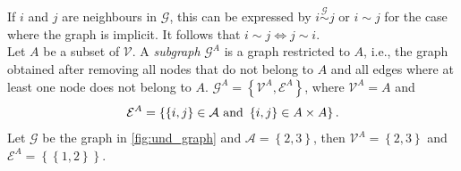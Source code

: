 If $i$ and $j$ are neighbours in $\mathcal{G}$, this can be expressed by $i\overset{\mathcal{G}}{\sim}j$ or $i\sim j$ for the case where the graph is implicit. It follows that $i\sim j\Longleftrightarrow j\sim i$. \\
Let $A$ be a subset of $\mathcal{V}$. A \textit{subgraph} $\mathcal{G}^A$ is a graph restricted to $A$, i.e., the graph obtained after removing all nodes that do not belong to $A$ and all edges where at least one node does not belong to $A$. $\mathcal{G}^A=\left\lbrace\mathcal{V}^A,\mathcal{E}^A\right\rbrace$, where $\mathcal{V}^A=A$ and 
\begin{equation*}
    \mathcal{E}^A = \left\lbrace\left\lbrace i,j\right\rbrace\in\mathcal{A} \hbox{ and } \left\lbrace i,j\right\rbrace\in A\times A\right\rbrace.
\end{equation*}
Let $\mathcal{G}$ be the graph in \autoref{fig:und_graph} and $\mathcal{A}=\left\lbrace2,3\right\rbrace$, then $\mathcal{V}^A=\left\lbrace2,3\right\rbrace$ and $\mathcal{E}^A=\left\lbrace\left\lbrace 1,2\right\rbrace\right\rbrace$\autocite[Cf.][]{rue2005gaussian}.
